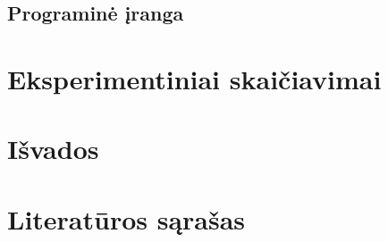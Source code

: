 \documentclass{ktu_phd_summary}
\begin{document}
\subsection{Programinė įranga}



% 

\clearpage

\section{Eksperimentiniai skaičiavimai}


\clearpage

\section{Išvados}


\clearpage

\section*{Literatūros sąrašas}

\begingroup
   \renewcommand{\section}[2]{}%
   
   
\endgroup
\end{document}

